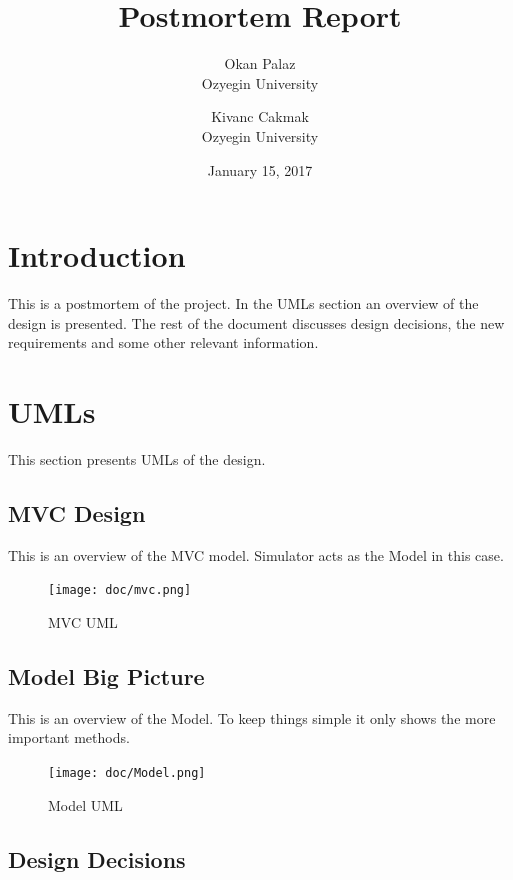 \documentclass[]{article}
\date{}
\begin{document}
\title{Postmortem Report}
\date{January 15, 2017}
\author{Okan Palaz\\ Ozyegin University \and Kivanc Cakmak \\ Ozyegin University}

\maketitle

\section{Introduction}\label{introduction}

This is a postmortem of the project. In the UMLs section an overview of
the design is presented. The rest of the document discusses design
decisions, the new requirements and some other relevant information.

\section{UMLs}\label{umls}

This section presents UMLs of the design.

\subsection{MVC Design}\label{mvc-design}

This is an overview of the MVC model. Simulator acts as the Model in
this case.

\begin{figure}[H]
\centering
\texttt{[image: doc/mvc.png]}
\caption{MVC UML}
\end{figure}

\subsection{Model Big Picture}\label{model-big-picture}

This is an overview of the Model. To keep things simple it only shows
the more important methods.

\begin{figure}[H]
\centering
\texttt{[image: doc/Model.png]}
\caption{Model UML}
\end{figure}

\subsection{Design Decisions}\label{design-decisions}
\end{document}

